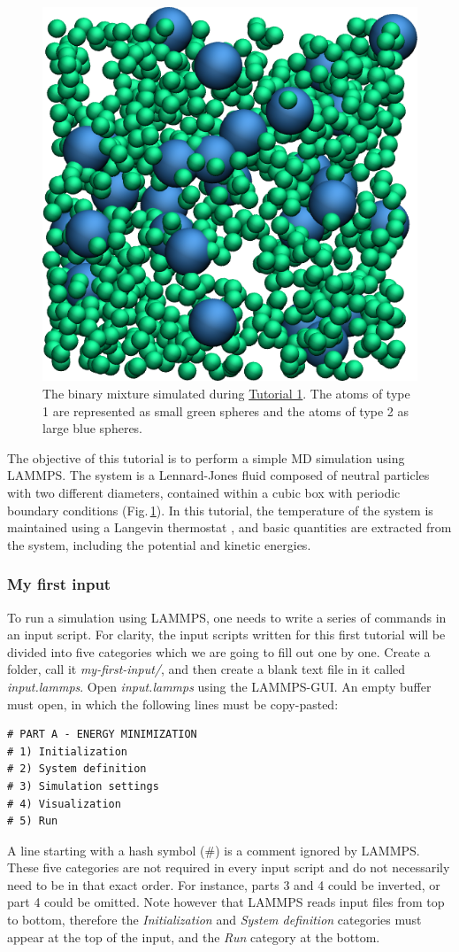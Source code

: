 \documentclass[9pt,tutorial]{livecoms}
\begin{document}
\begin{figure}
\centering
\includegraphics[width=0.55\linewidth]{LJ}
\caption{The binary mixture simulated during \hyperref[lennard-jones-label]{Tutorial 1}. The atoms of type 1 are represented as small green spheres and the atoms of type 2 as large blue spheres.}
\label{fig:LJ}
\end{figure}

\noindent The objective of this tutorial is to perform a simple MD simulation using LAMMPS. The system is a Lennard-Jones fluid composed of neutral particles with two different diameters, contained within a cubic box with periodic boundary conditions (Fig.\,\ref{fig:LJ}). In this tutorial, the temperature of the system is maintained using a Langevin thermostat \cite{schneider1978molecular}, and basic quantities are extracted from the system, including the potential and kinetic energies.

\subsubsection{My first input}

\noindent To run a simulation using LAMMPS, one needs to write a series of commands in an input script. For clarity, the input scripts written for this first tutorial will be divided into five categories which we are going to fill out one by one. Create a folder, call it \textit{my-first-input/}, and then create a blank text file in it called \textit{input.lammps}. Open \textit{input.lammps} using the LAMMPS-GUI. An empty buffer must open, in which the following lines must be copy-pasted:
{\normalsize \begin{verbatim}
# PART A - ENERGY MINIMIZATION
# 1) Initialization
# 2) System definition
# 3) Simulation settings
# 4) Visualization
# 5) Run
\end{verbatim}}
\noindent A line starting with a hash symbol ($\#$) is a comment ignored by LAMMPS. These five categories are not required in every input script and do not necessarily need to be in that exact order. For instance, parts 3 and 4 could be inverted, or part 4 could be omitted. Note however that LAMMPS reads input files from top to bottom, therefore the \textit{Initialization} and \textit{System definition} categories must appear at the top of the input, and the \textit{Run} category at the bottom.
\end{document}

